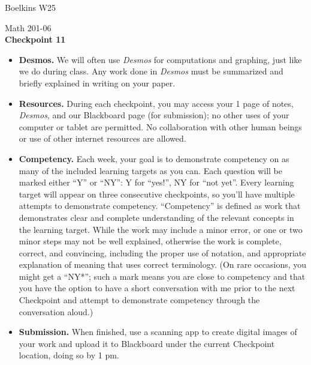 \documentclass[11 pt]{article}
\begin{document}
 \hfill Boelkins  W25\\
 
\begin{center}
Math 201-06 \\
{\bf Checkpoint 11}
\end{center}



\begin{itemize}
	
	\item {\bf Desmos.} We will often use \emph{Desmos} for computations and graphing, just like we do during class.  Any work done in \emph{Desmos} must be summarized and briefly explained in writing on your paper.  
	
	\item {\bf Resources.} During each checkpoint, you may access your 1 page of notes, \emph{Desmos}, and our Blackboard page (for submission); no other uses of your computer or tablet are permitted.  No collaboration with other human beings or use of other internet resources are allowed.
	
	\item {\bf Competency.} Each week, your goal is to demonstrate competency on as many of the included learning targets as you can.  Each question will be marked either ``Y'' or ``NY'': Y for ``yes!'', NY for ``not yet''.  Every learning target will appear on three consecutive checkpoints, so you'll have multiple attempts to demonstrate competency.  ``Competency'' is defined as work that demonstrates clear and complete understanding of the relevant concepts in the learning target. While the work may include a minor error, or one or two minor steps may not be well explained, otherwise the work is complete, correct, and convincing, including the proper use of notation, and appropriate explanation of meaning that uses correct terminology.  (On rare occasions, you might get a ``NY*''; such a mark means you are close to competency and that you have the option to have a short conversation with me prior to the next Checkpoint and attempt to demonstrate competency through the conversation aloud.)	
	
	\item {\bf Submission.}  When finished, use a scanning app to create digital images of your work and upload it to Blackboard under the current Checkpoint location, doing so by 1 pm.
	
\end{itemize}
\end{document}
